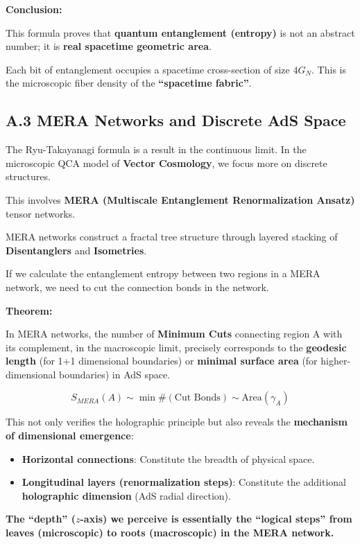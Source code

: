\textbf{Conclusion:}

This formula proves that \textbf{quantum entanglement (entropy)} is not an abstract number; it is \textbf{real spacetime geometric area}.

Each bit of entanglement occupies a spacetime cross-section of size $4G_N$. This is the microscopic fiber density of the \textbf{``spacetime fabric''}.

\subsection{A.3 MERA Networks and Discrete AdS Space}

The Ryu-Takayanagi formula is a result in the continuous limit. In the microscopic QCA model of \textbf{Vector Cosmology}, we focus more on discrete structures.

This involves \textbf{MERA (Multiscale Entanglement Renormalization Ansatz)} tensor networks.

MERA networks construct a fractal tree structure through layered stacking of \textbf{Disentanglers} and \textbf{Isometries}.

If we calculate the entanglement entropy between two regions in a MERA network, we need to cut the connection bonds in the network.

\textbf{Theorem:}

In MERA networks, the number of \textbf{Minimum Cuts} connecting region A with its complement, in the macroscopic limit, precisely corresponds to the \textbf{geodesic length} (for 1+1 dimensional boundaries) or \textbf{minimal surface area} (for higher-dimensional boundaries) in AdS space.

\[S_{MERA}(A) \sim \min \#(\text{Cut Bonds}) \sim \text{Area}(\gamma_A)\]

This not only verifies the holographic principle but also reveals the \textbf{mechanism of dimensional emergence}:

\begin{itemize}
\item \textbf{Horizontal connections}: Constitute the breadth of physical space.

\item \textbf{Longitudinal layers (renormalization steps)}: Constitute the additional \textbf{holographic dimension} (AdS radial direction).
\end{itemize}

\textbf{The ``depth'' ($z$-axis) we perceive is essentially the ``logical steps'' from leaves (microscopic) to roots (macroscopic) in the MERA network.}


